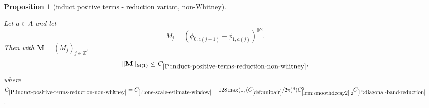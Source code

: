 \documentclass[12pt,reqno]{amsart}
\theoremstyle{plain}
\newtheorem{proposition}[theorem]{Proposition}
\numberwithin{equation}{section}
\theoremstyle{remark}
\newcommand{\uses}[1]{}
\newcommand{\usesdefs}[1]{}
\newcommand{\leanok}{}
\newcommand{\lean}[1]{}
\newcommand{\Z}{{\mathbb Z}}
\newcommand{\M}{\mathbf{M}}
\begin{document}
\begin{proposition}[induct positive terms - reduction variant, non-Whitney]
\label{P:induct-positive-terms-reduction-non-whitney}\uses{P:one-scale-estimate-window,L:fourier-transform-window,Operations on spaced sequences,lem:smoothdecay2,lem:scaleest,P:vanishing-diagonal-reduction,P:diagonal-band-reduction}\usesdefs{bracket bump,multiplicatively spaced monotone sequences,auto:unitary-matrices-definition,kernel sequences,def:cn-window,def:unipair}
\lean{Auto.inductPositiveTermsReductionNonWhitney}
\leanok
Let $a\in A$ and let
\begin{equation}\label{auto:non-Whitney-kernel}M_j=({\phi}_{0,a(j-1)}-{\phi}_{1,a(j)})^{\otimes 2}.\end{equation}
Then with $\M=(M_j)_{j\in \Z}$,  \begin{equation}\label{auto:non-Whitney-reduction-bound}\|\M\|_{\rm M(1)}\le C_{\ref{P:induct-positive-terms-reduction-non-whitney}},\end{equation}
where $C_{\ref{P:induct-positive-terms-reduction-non-whitney}}=C_{\ref{P:one-scale-estimate-window}}+ 128 \max(1,(C_{\ref{def:unipair}}/2\pi)^4) C_{\ref{lem:smoothdecay2},2}^2C_{\ref{P:diagonal-band-reduction}}$.
\end{proposition}
\end{document}
